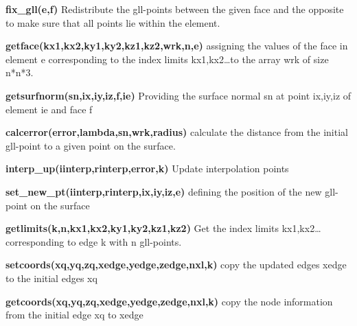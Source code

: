 \textbf{fix\_gll(e,f)} Redistribute the gll-points between the given face and the opposite to make sure that all points lie within the element.

\textbf{getface(kx1,kx2,ky1,ky2,kz1,kz2,wrk,n,e)} assigning the values of the face in element e corresponding to the index limits kx1,kx2\ldots to the array wrk of size n*n*3.

\textbf{getsurfnorm(sn,ix,iy,iz,f,ie)} Providing the surface normal sn at point ix,iy,iz of element ie and face f 

\textbf{calcerror(error,lambda,sn,wrk,radius)} calculate the distance from the initial gll-point to a given point on the surface.  

\textbf{interp\_up(iinterp,rinterp,error,k)} Update interpolation points

\textbf{set\_new\_pt(iinterp,rinterp,ix,iy,iz,e)} defining the position of the new gll-point on the surface

\textbf{getlimits(k,n,kx1,kx2,ky1,ky2,kz1,kz2)} Get the index limits kx1,kx2\ldots corresponding to edge k with n gll-points.

\textbf{setcoords(xq,yq,zq,xedge,yedge,zedge,nxl,k)} copy the updated edges xedge to the initial edges xq

\textbf{getcoords(xq,yq,zq,xedge,yedge,zedge,nxl,k)} copy the node information from the initial edge xq to xedge
